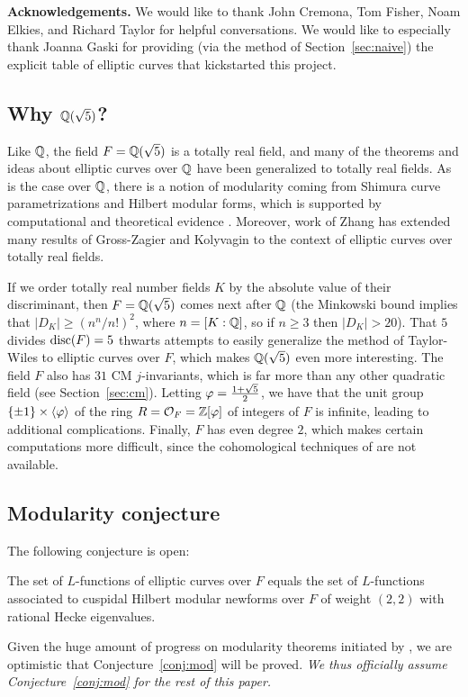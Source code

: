 \documentclass{amsart}
\begin{document}
{\bf Acknowledgements.} We would like to thank John Cremona, Tom
Fisher, Noam Elkies, and Richard Taylor for helpful conversations.  We
would like to especially thank Joanna Gaski for providing (via the
method of Section~\ref{sec:naive}) the explicit table of elliptic
curves that kickstarted this project.
 
\subsection{Why $\mathbb{Q}(\sqrt{5})$?}

Like $\mathbb{Q}$, the field $F=\mathbb{Q}(\sqrt{5})$ is a totally real field, and
many of the theorems and ideas about elliptic curves over $\mathbb{Q}$ have
been generalized to totally real fields. As is the case over $\mathbb{Q}$,
there is a notion of modularity coming from Shimura curve
parametrizations and Hilbert modular forms, which is supported by
computational and theoretical evidence \cite{}.
Moreover, work of Zhang \cite{zhang:heightsshimura}  has extended many
results of Gross-Zagier \cite{gross-zagier} and Kolyvagin
\cite{kolyvagin:mordellweil} to the context of elliptic curves over
totally real fields.

If we order totally real number fields $K$ by the absolute value of
their discriminant, then $F=\mathbb{Q}(\sqrt{5})$ comes next after $\mathbb{Q}$ (the
Minkowski bound implies that $|D_K| \geq (n^n/n!)^2$, where
$n=[K:\mathbb{Q}]$, so if $n\geq 3$ then $|D_K|>20$). That $5$ divides
$\operatorname{disc}(F)=5$ thwarts attempts to easily generalize the method of
Taylor-Wiles to elliptic curves over $F$, which makes $\mathbb{Q}(\sqrt{5})$
even more interesting. The field $F$ also has $31$ CM $j$-invariants,
which is far more than any other quadratic field (see
Section~\ref{sec:cm}).  Letting $\varphi=\frac{1+\sqrt{5}}{2}$, we have
that the unit group $\{\pm 1\} \times \langle \varphi \rangle$ of the
ring $R=\mathcal{O}_F=\mathbb{Z}[\varphi]$ of integers of $F$ is infinite, leading to
additional complications.  Finally, $F$ has even degree $2$, which
makes certain computations more difficult, since the cohomological
techniques of \cite{greenberg-voight:shimura} are not available. 


\subsection{Modularity conjecture}\label{sec:mod}
The following conjecture is open:
\begin{conjecture}[Modularity]\label{conj:mod}
  The set of $L$-functions of elliptic curves over $F$ equals the set
  of $L$-functions associated to cuspidal Hilbert modular newforms
  over $F$ of weight $(2,2)$ with rational Hecke eigenvalues.
\end{conjecture}
Given the huge amount of progress on modularity theorems initiated by
\cite{wiles:fermat}, we are optimistic that Conjecture~\ref{conj:mod}
will be proved.  {\em We thus officially assume
  Conjecture~\ref{conj:mod} for the rest of this paper.}
\end{document}
